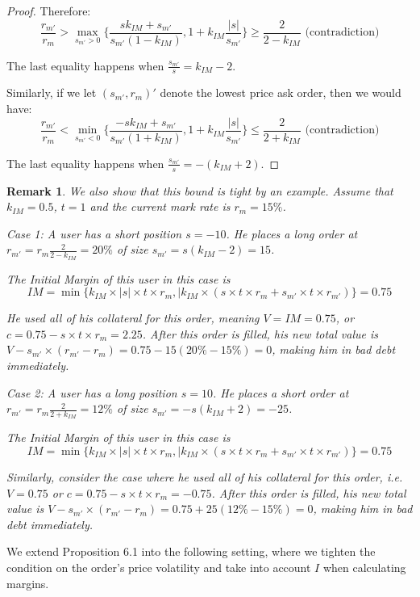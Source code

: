 \documentclass[notitlepage,reqno,11pt]{amsart}
\numberwithin{equation}{section}
\newtheorem{remark}{Remark}[section]
\begin{document}
\begin{proof}
Therefore: 
$$
\frac{r_{m'}}{r_m} > \max_{s_{m'}>0}\{\frac{sk_{IM} + s_{m'}}{s_{m'}(1-k_{IM})},1 + k_{IM}\frac{|s|}{s_{m'}}\} \geq \frac{2}{2-k_{IM}} \text{ (contradiction)}
$$

The last equality happens when $\frac{s_{m'}}{s} = k_{IM}-2$.

Similarly, if we let $(s_{m'},r_m)'$ denote the lowest price ask order, then we would have: 
$$
\frac{r_{m'}}{r_m} < \min_{s_{m'}<0}\{\frac{-sk_{IM} + s_{m'}}{s_{m'}(1+k_{IM})},1 + k_{IM}\frac{|s|}{s_{m'}}\} \leq \frac{2}{2+k_{IM}}\text{ (contradiction)}
$$

The last equality happens when $\frac{s_{m'}}{s} = -(k_{IM}+2)$.

\end{proof}
\begin{remark}\label{6.1}
    We also show that this bound is tight by an example. Assume that $k_{IM} = 0.5$, $t=1$ and the current mark rate is $r_m = 15\%$. 
    
    Case 1: A user has a short position $s=-10$. He places a long order at $r_{m'} = r_m\frac{2}{2-k_{IM}} = 20\%$ of size $s_{m'} = s(k_{IM}-2) = 15$. 
    
    The Initial Margin of this user in this case is 
    $$
    IM = \min\{k_{IM}\times |s|\times t\times r_m,|k_{IM}\times (s\times t\times r_m+s_{m'}\times t\times r_{m'})\} = 0.75
    $$
    
    He used all of his collateral for this order, meaning $V = IM = 0.75$, or $c = 0.75 -s\times t \times r_m = 2.25$. After this order is filled, his new total value is $V - s_{m'}\times(r_{m'} - r_m) = 0.75 - 15(20\%-15\%)=0$, making him in bad debt immediately.

    Case 2: A user has a long position $s=10$. He places a short order at $r_{m'} = r_m\frac{2}{2+k_{IM}} = 12\%$ of size $s_{m'} = -s(k_{IM}+2) = -25$. 
    
    The Initial Margin of this user in this case is 
    $$
    IM = \min\{k_{IM}\times |s|\times t\times r_m,|k_{IM}\times (s\times t\times r_m+s_{m'}\times t\times r_{m'})\} = 0.75
    $$
    
    Similarly, consider the case where he used all of his collateral for this order, i.e. $V = 0.75$ or $c = 0.75 -s\times t \times r_m = -0.75$. After this order is filled, his new total value is $V - s_{m'}\times(r_{m'} - r_m) = 0.75 + 25(12\%-15\%)=0$, making him in bad debt immediately.
\end{remark}

We extend Proposition 6.1 into the following setting, where we tighten the condition on the order's price volatility and take into account $I$ when calculating margins.
\end{document}

